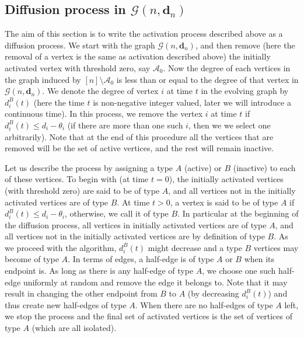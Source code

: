 \documentclass[11pt]{article}
\newcommand{\cA}{\mathcal{A}}
\newcommand{\cG}{\mathcal{G}}
\newcommand\bd{\mathbf{d}}
\begin{document}
\subsection{Diffusion process in $\cG(n,\bd_n)$}
The aim of this section is to write the activation process described above as a diffusion process. 
We start with the graph $\cG(n,\bd_n)$, and then remove (here the removal of a vertex is the same as activation described above) the initially activated vertex with threshold zero, say $\cA_0$. Now the degree of each vertices in the graph induced by $[n]\setminus \cA_0$ is less than or equal to the degree of that vertex in $\cG(n,\bd_n)$. We denote the degree of vertex $i$ at time $t$ in the evolving graph by $d_{i}^B(t)$ (here the time $t$ is non-negative integer valued, later we will introduce a continuous time). In this process, we remove the vertex $i$ at time $t$ if $d_i^B(t) \leq d_i-\theta_i$ (if there are more than one such $i$, then we we select one arbitrarily). Note that at the end of this procedure all the vertices that are removed will be the set of active vertices, and the rest will remain inactive. %


Let us describe the process by assigning a type $A$ (active) or $B$ (inactive) to each of these vertices. To begin with (at time $t=0$), the initially activated vertices (with threshold zero) are said to be of type $A$, and all vertices not in the initially activated vertices are of type $B$. At time $t>0$, a vertex is said to be of type $A$ if $d_i^B(t) \leq d_i-\theta_i$, otherwise, we call it of type $B$. In particular at the beginning of the diffusion process, all vertices in initially activated vertices are of type $A$, and all vertices not in the initially activated vertices are by definition of type $B$. As we proceed with the algorithm, $d_i^B(t)$ might decrease and a type $B$ vertices may become of type $A$. 
In terms of edges, a half-edge is of type $A$ or $B$ when its endpoint is. As long as there is any half-edge of type $A$, we choose one such half-edge uniformly at random and remove the edge it belongs to. Note that it may result in changing the other endpoint from $B$ to
$A$ (by decreasing $d_i^B(t)$) and thus create new half-edges of type $A$. When there are no half-edges of type $A$ left, we stop the process and the final set of activated vertices is the set of vertices of type $A$ (which are all isolated). 
\end{document}
